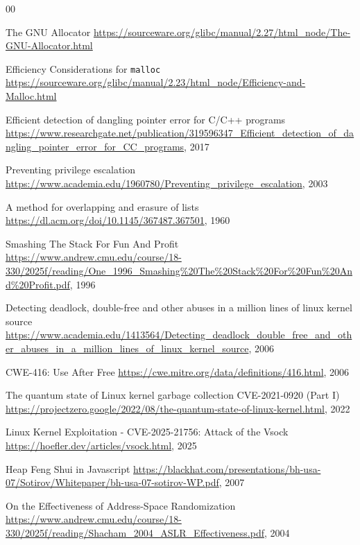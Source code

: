 %
%
\begin{thebibliography}{00}


The GNU Allocator
\url{https://sourceware.org/glibc/manual/2.27/html_node/The-GNU-Allocator.html}

Efficiency Considerations for \texttt{malloc}
\url{https://sourceware.org/glibc/manual/2.23/html_node/Efficiency-and-Malloc.html}

Efficient detection of dangling pointer error for C/C++ programs
\url{https://www.researchgate.net/publication/319596347_Efficient_detection_of_dangling_pointer_error_for_CC_programs}, 2017

Preventing privilege escalation
\url{https://www.academia.edu/1960780/Preventing_privilege_escalation}, 2003

A method for overlapping and erasure of lists
\url{https://dl.acm.org/doi/10.1145/367487.367501}, 1960

Smashing The Stack For Fun And Profit
\url{https://www.andrew.cmu.edu/course/18-330/2025f/reading/One_1996_Smashing%20The%20Stack%20For%20Fun%20And%20Profit.pdf}, 1996

Detecting deadlock, double-free and other abuses in a million lines of linux kernel source
\url{https://www.academia.edu/1413564/Detecting_deadlock_double_free_and_other_abuses_in_a_million_lines_of_linux_kernel_source}, 2006

CWE-416: Use After Free
\url{https://cwe.mitre.org/data/definitions/416.html}, 2006

The quantum state of Linux kernel garbage collection CVE-2021-0920 (Part I)
\url{https://projectzero.google/2022/08/the-quantum-state-of-linux-kernel.html}, 2022

Linux Kernel Exploitation - CVE-2025-21756: Attack of the Vsock
\url{https://hoefler.dev/articles/vsock.html}, 2025

Heap Feng Shui in Javascript
\url{https://blackhat.com/presentations/bh-usa-07/Sotirov/Whitepaper/bh-usa-07-sotirov-WP.pdf}, 2007

On the Effectiveness of Address-Space Randomization
\url{https://www.andrew.cmu.edu/course/18-330/2025f/reading/Shacham_2004_ASLR_Effectiveness.pdf}, 2004


\end{thebibliography}
